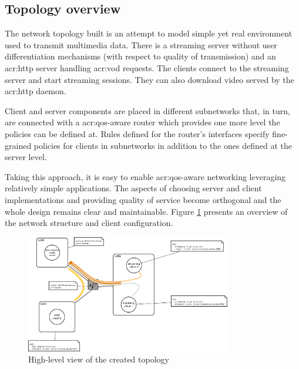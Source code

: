 \documentclass[11pt]{book}
\begin{document}
      \subsection{Topology overview}

        The network topology built is an attempt to model simple yet real environment used to transmit multimedia data.
        There is a streaming server without user differentiation mechanisms (with respect to quality of transmission)
        and an \gls{acr:http} server handling \gls{acr:vod} requests. The clients connect to the streaming server and start streaming
        sessions. They can also download video served by the \gls{acr:http} daemon.

        Client and server components are placed in different subnetworks that, in turn, are connected with a \gls{acr:qos}-aware
        router which provides one more level the policies can be defined at. Rules defined for the router's interfaces
        specify fine-grained policies for clients in subnetworks in addition to the ones defined at the server level.

        Taking this approach, it is easy to enable \gls{acr:qos}-aware networking leveraging relatively simple applications. The
        aspects of choosing server and client implementations and providing quality of service become orthogonal and the
        whole design remains clear and maintainable. Figure \ref{fig:cs:scenario} presents an overview of the network
        structure and client configuration.
      
        \begin{figure}[H]
          \begin{center}
            \includegraphics[width=0.8\textwidth]{img/test-case/diagram.pdf}
          \end{center}

          \caption{High-level view of the created topology}
          \label{fig:cs:scenario}
        \end{figure}
      
\end{document}
